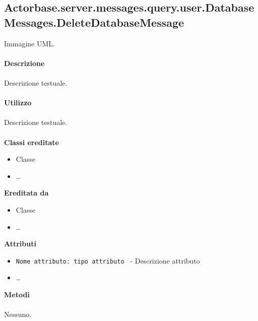 \documentclass[a4paper]{article}
\begin{document}
	\subsection{Actorbase.server.messages.query.user.DatabaseMessages.DeleteDatabaseMessage}
		Immagine UML.
		\\ \\
		\textbf{Descrizione}
			\\ \\
			Descrizione testuale.
			\\ \\
		\textbf{Utilizzo}
			\\ \\
			Descrizione testuale.
			\\ \\
		\textbf{Classi ereditate}
			\begin{itemize}
				\item Classe
				\item \dots
			\end{itemize}
		\textbf{Ereditata da}
			\begin{itemize}
				\item Classe
				\item \dots
			\end{itemize}
		\textbf{Attributi}
			\begin{itemize}
				\item \texttt{Nome attributo: tipo attributo } - Descrizione attributo
				\item \dots
			\end{itemize}
		\textbf{Metodi}
			\\ \\
			Nessuno.	
			
			
\end{document}
